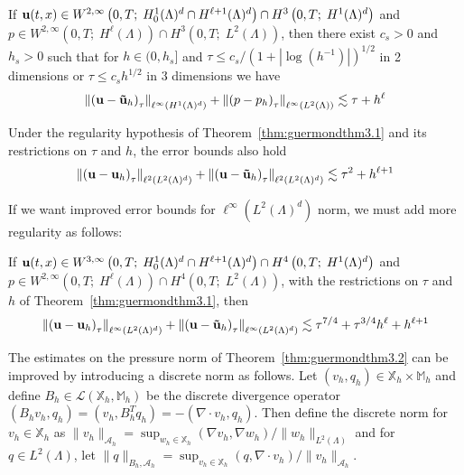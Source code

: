 \documentclass[letterpaper]{erdc}
\begin{document}
\begin{theorem}\label{thm:guermondthm3.2}
If $\textbf{u}(t,x)\in W^{2,\infty}\left(0,T;\; H_0^1(\Lambda)^d \cap H^{\ell+1}(\Lambda)^d  \right) \cap H^3\left(0,T;\; H^1(\Lambda)^d\right)$ and $p\in W^{2,\infty}\left(0,T;\; H^{\ell}(\Lambda) \right)\cap H^3\left(0,T;\; L^2(\Lambda)\right)$, then there exist $c_s>0$ and $h_s>0$ such that for $h\in (0,h_s]$ and $\tau \leq c_s /\left(1+|\log(h^{-1})| \right)^{1/2}$ in 2 dimensions or $\tau \leq c_s h^{1/2}$ in 3 dimensions we have
  \begin{equation}
    \left\| \left(\textbf{u} - \mathbf{\tilde{u}}_h \right)_{\tau} \right\|_{\ell^{\infty}\left(H^1(\Lambda)^d\right)} + \left\| \left(p - p_h \right)_{\tau} \right\|_{\ell^{\infty}\left(L^2(\Lambda)\right)} \lesssim \tau + h^{\ell}
  \end{equation}
\end{theorem}

\begin{theorem}\label{thm:guermondthm3.3}
Under the regularity hypothesis of Theorem~\ref{thm:guermondthm3.1} and its restrictions on $\tau$ and $h$, the error bounds also hold
    \begin{equation}
      \left\| \left(\textbf{u} - \textbf{u}_h \right)_{\tau} \right\|_{\ell^{2}\left(L^2(\Lambda)^d\right)} + \left\| \left(\textbf{u} - \mathbf{\tilde{u}}_h \right)_{\tau} \right\|_{\ell^{2}\left(L^2(\Lambda)^d\right)} \lesssim \tau^2 + h^{\ell+1}
    \end{equation}
\end{theorem}

If we want improved error bounds for $\ell^{\infty}\left( L^2(\Lambda)^d \right)$ norm, we must add more regularity as follows:
\begin{theorem}\label{thm:guermondthm3.4}
If $\textbf{u}(t,x)\in W^{3,\infty}\left(0,T;\; H_0^1(\Lambda)^d \cap H^{\ell+1}(\Lambda)^d  \right) \cap H^4\left(0,T;\; H^1(\Lambda)^d\right)$ and $p\in W^{2,\infty}\left(0,T;\; H^{\ell}(\Lambda) \right)\cap H^4\left(0,T;\; L^2(\Lambda)\right)$, with the restrictions on $\tau$ and $h$ of Theorem~\ref{thm:guermondthm3.1}, then
  \begin{equation}
    \left\| \left(\textbf{u} - \textbf{u}_h \right)_{\tau} \right\|_{\ell^{\infty}\left(L^2(\Lambda)^d\right)} + \left\| \left(\textbf{u} - \mathbf{\tilde{u}}_h \right)_{\tau} \right\|_{\ell^{\infty}\left(L^2(\Lambda)^d\right)} \lesssim \tau^{7/4} + \tau^{3/4}h^{\ell} + h^{\ell+1}
  \end{equation}
\end{theorem}

The estimates on the pressure norm of Theorem~\ref{thm:guermondthm3.2} can be improved by introducing a discrete norm as follows.  Let $(v_h,q_h) \in \mathbb{X}_h\times \mathbb{M}_h$ and define $B_h \in \mathcal{L}(\mathbb{X}_h,\mathbb{M}_h)$ be the discrete divergence operator $(B_h v_h, q_h) = (v_h, B_h^T q_h) = -(\nabla\cdot v_h, q_h)$.  Then define the discrete norm for $v_h \in \mathbb{X}_h$ as $\|v_h\|_{\mathcal{A}_h} = \sup_{w_h \in \mathbb{X}_h} (\nabla v_h, \nabla w_h)/ \|w_h\|_{L^2(\Lambda)}$ and for $q\in L^2(\Lambda)$, let $\|q\|_{B_h, \mathcal{A}_h} = \sup_{v_h\in \mathbb{X}_h} (q, \nabla\cdot v_h)/ \|v_h\|_{\mathcal{A}_h}$.
\end{document}

